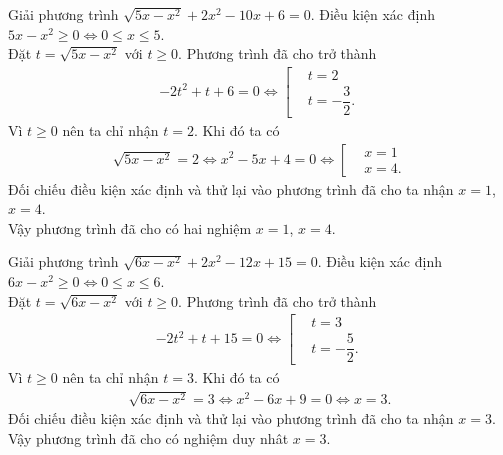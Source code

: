 \begin{bt}%
	Giải phương trình $\sqrt{5x - x^2} + 2x^2 - 10x  + 6 = 0$.
	\loigiai
	{
		Điều kiện xác định $5x - x^2 \geq 0 \Leftrightarrow 0 \leq x \leq 5$.\\
		Đặt $t = \sqrt{5x-x^2}$ với $t \geq 0$. Phương trình đã cho trở thành
		\begin{align*}
		-2t^2+t+6=0 \Leftrightarrow \left[\begin{aligned} & t = 2 \\& t=-\dfrac{3}{2}. \end{aligned}\right.
		\end{align*}
		Vì $t \geq 0$ nên ta chỉ nhận $t = 2$. Khi đó ta có
		\begin{align*}
		\sqrt{5x-x^2}=2 \Leftrightarrow x^2-5x+4=0 \Leftrightarrow \left[\begin{aligned}& x=1 \\& x=4. \end{aligned}\right.
		\end{align*}
		Đối chiếu điều kiện xác định và thử lại vào phương trình đã cho ta nhận $x = 1$, $x = 4$.\\
		Vậy phương trình đã cho có hai nghiệm $x = 1$, $x = 4$.
	}
\end{bt}


\begin{bt}%
	Giải phương trình $\sqrt{6x - x^2} + 2x^2 - 12x + 15 = 0$.
	\loigiai
	{
		Điều kiện xác định $6x - x^2 \geq 0 \Leftrightarrow 0 \leq x \leq 6$.\\
		Đặt $t = \sqrt{6x-x^2}$ với $t \geq 0$. Phương trình đã cho trở thành
		\begin{align*}
		-2t^2+t+15=0 \Leftrightarrow \left[\begin{aligned} & t = 3 \\& t=-\dfrac{5}{2}. \end{aligned}\right.
		\end{align*}
		Vì $t \geq 0$ nên ta chỉ nhận $t = 3$. Khi đó ta có
		\begin{align*}
		\sqrt{6x-x^2}=3 \Leftrightarrow x^2-6x+9=0 \Leftrightarrow x = 3.
		\end{align*}
		Đối chiếu điều kiện xác định và thử lại vào phương trình đã cho ta nhận $x = 3$.\\
		Vậy phương trình đã cho có nghiệm duy nhât $x = 3$.
	}
\end{bt}


